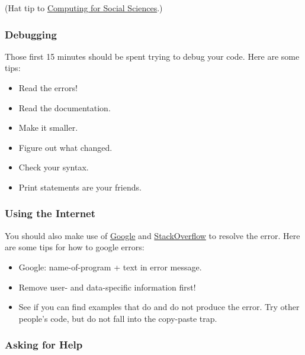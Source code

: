 \documentclass[
]{book}
\providecommand{\tightlist}{%
  \setlength{\itemsep}{0pt}\setlength{\parskip}{0pt}}
\begin{document}
(Hat tip to \href{https://cfss.uchicago.edu/faq/asking-questions/}{Computing for Social Sciences}.)

\hypertarget{debugging}{%
\subsubsection*{Debugging}\label{debugging}}

Those first 15 minutes should be spent trying to debug your code. Here are some tips:

\begin{itemize}
\tightlist
\item
  Read the errors!
\item
  Read the documentation.
\item
  Make it smaller.
\item
  Figure out what changed.
\item
  Check your syntax.
\item
  Print statements are your friends.
\end{itemize}

\hypertarget{using-the-internet}{%
\subsubsection*{Using the Internet}\label{using-the-internet}}

You should also make use of \href{https://www.google.com}{Google} and \href{http://stackoverflow.com/}{StackOverflow} to resolve the error. Here are some tips for how to google errors:

\begin{itemize}
\tightlist
\item
  Google: name-of-program + text in error message.
\item
  Remove user- and data-specific information first!
\item
  See if you can find examples that do and do not produce the error. Try other people's code, but do not fall into the copy-paste trap.
\end{itemize}

\hypertarget{asking-for-help}{%
\subsubsection*{Asking for Help}\label{asking-for-help}}
\end{document}
